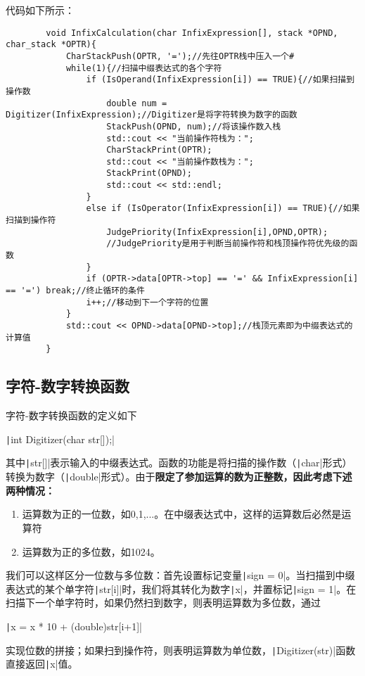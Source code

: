 \documentclass[10pt,a4paper]{article}
\begin{document}
	代码如下所示：
	\begin{verbatim}
		void InfixCalculation(char InfixExpression[], stack *OPND, char_stack *OPTR){
			CharStackPush(OPTR, '=');//先往OPTR栈中压入一个#
			while(1){//扫描中缀表达式的各个字符
				if (IsOperand(InfixExpression[i]) == TRUE){//如果扫描到操作数
					double num = Digitizer(InfixExpression);//Digitizer是将字符转换为数字的函数
					StackPush(OPND, num);//将该操作数入栈
					std::cout << "当前操作符栈为：";
					CharStackPrint(OPTR);
					std::cout << "当前操作数栈为：";
					StackPrint(OPND);
					std::cout << std::endl;
				}
				else if (IsOperator(InfixExpression[i]) == TRUE){//如果扫描到操作符
					JudgePriority(InfixExpression[i],OPND,OPTR);
					//JudgePriority是用于判断当前操作符和栈顶操作符优先级的函数
				}
				if (OPTR->data[OPTR->top] == '=' && InfixExpression[i] == '=') break;//终止循环的条件
				i++;//移动到下一个字符的位置
			}
			std::cout << OPND->data[OPND->top];//栈顶元素即为中缀表达式的计算值
		}
	\end{verbatim}
	\subsection{字符-数字转换函数}
	\noindent 字符-数字转换函数的定义如下
	\begin{center}
		\texttt|int Digitizer(char str[]);|
	\end{center}
	其中\texttt|str[]|表示输入的中缀表达式。函数的功能是将扫描的操作数（\texttt|char|形式）转换为数字（\texttt|double|形式）。由于\textbf{限定了参加运算的数为正整数，因此考虑下述两种情况：}
	\begin{enumerate}
		\item 运算数为正的一位数，如0,1,...。在中缀表达式中，这样的运算数后必然是运算符
		\item 运算数为正的多位数，如1024。
	\end{enumerate}
	我们可以这样区分一位数与多位数：首先设置标记变量\texttt|sign = 0|。当扫描到中缀表达式的某个单字符\texttt|str[i]|时，我们将其转化为数字\texttt|x|，并置标记\texttt|sign = 1|。在扫描下一个单字符时，如果仍然扫到数字，则表明运算数为多位数，通过
	\begin{center}
		\texttt|x = x * 10 + (double)str[i+1]|
	\end{center}
	实现位数的拼接；如果扫到操作符，则表明运算数为单位数，\texttt|Digitizer(str)|函数直接返回\texttt|x|值。\\
	
\end{document}
